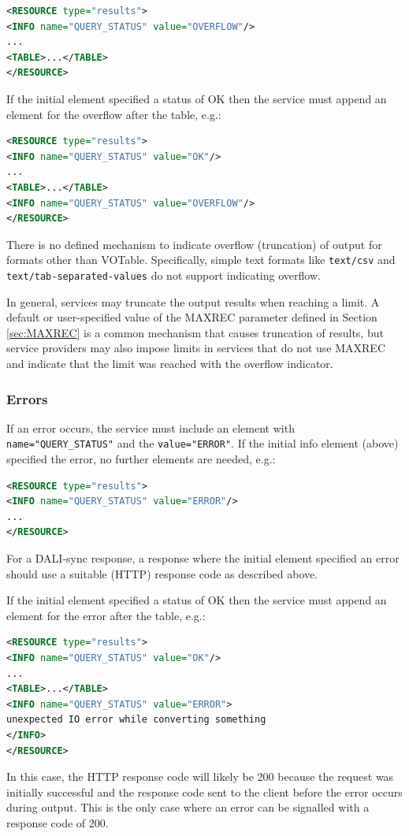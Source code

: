\documentclass[11pt,letter]{ivoa}
\begin{document}
\begin{lstlisting}[language=XML]
<RESOURCE type="results">
<INFO name="QUERY_STATUS" value="OVERFLOW"/>
...
<TABLE>...</TABLE>
</RESOURCE>
\end{lstlisting}

If the initial  element specified a status of OK then the service must
append an  element for the overflow after the table, e.g.:

\begin{lstlisting}[language=XML]
<RESOURCE type="results">
<INFO name="QUERY_STATUS" value="OK"/>
...
<TABLE>...</TABLE>
<INFO name="QUERY_STATUS" value="OVERFLOW"/>
</RESOURCE>
\end{lstlisting}

There is no defined mechanism to indicate overflow (truncation) of output for formats
other than VOTable. Specifically, simple text formats like \verb|text/csv| and
\verb|text/tab-separated-values| do not support indicating overflow.

In general, services may truncate the output results when reaching a limit. A default or
user-specified value of the MAXREC parameter defined in Section \ref{sec:MAXREC}
is a common mechanism that causes truncation
of results, but service providers may also impose limits in services that do not use
MAXREC and indicate that the limit was reached with the overflow indicator.


\subsubsection{Errors}
\label{sect:errors}

If an error occurs, the service must include an  element with
\verb|name="QUERY_STATUS"| and the \verb|value="ERROR"|. If the initial info element (above)
specified the error, no further elements are needed, e.g.:

\begin{lstlisting}[language=XML]
<RESOURCE type="results">
<INFO name="QUERY_STATUS" value="ERROR"/>
...
</RESOURCE>
\end{lstlisting}
For a DALI-sync response, a response where the initial  element specified an
error should use a suitable (HTTP) response code as described above.

If the initial  element specified a status of OK then the service must
append an  element for the error after the table, e.g.:

\begin{lstlisting}[language=XML]
<RESOURCE type="results">
<INFO name="QUERY_STATUS" value="OK"/>
...
<TABLE>...</TABLE>
<INFO name="QUERY_STATUS" value="ERROR">
unexpected IO error while converting something
</INFO>
</RESOURCE>
\end{lstlisting}
In this case, the HTTP response code will likely be 200 because the request was initially successful
and the response code sent to the client before the error occurs during output. This is the only case
where an error can be signalled with a response code of 200.
\end{document}
